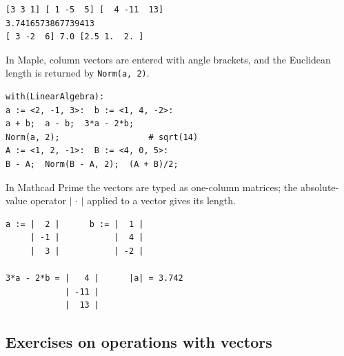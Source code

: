 \begin{Verbatim}[fontsize=\footnotesize,frame=single,label={\small Output}]
[3 3 1] [ 1 -5  5] [  4 -11  13]
3.7416573867739413
[ 3 -2  6] 7.0 [2.5 1.  2. ]
\end{Verbatim}

In Maple, column vectors are entered with angle brackets, and the
Euclidean length is returned by \texttt{Norm(a, 2)}.

\begin{Verbatim}[fontsize=\footnotesize,frame=single,label={\small Maple}]
with(LinearAlgebra):
a := <2, -1, 3>:  b := <1, 4, -2>:
a + b;  a - b;  3*a - 2*b;
Norm(a, 2);                  # sqrt(14)
A := <1, 2, -1>:  B := <4, 0, 5>:
B - A;  Norm(B - A, 2);  (A + B)/2;
\end{Verbatim}

In Mathcad Prime the vectors are typed as one-column matrices; the
absolute-value operator $|\,\cdot\,|$ applied to a vector gives its length.

\begin{Verbatim}[fontsize=\footnotesize,frame=single,label={\small Mathcad}]
a := |  2 |      b := |  1 |
     | -1 |           |  4 |
     |  3 |           | -2 |

3*a - 2*b = |   4 |      |a| = 3.742
            | -11 |
            |  13 |
\end{Verbatim}

\subsection{Exercises on operations with vectors}

